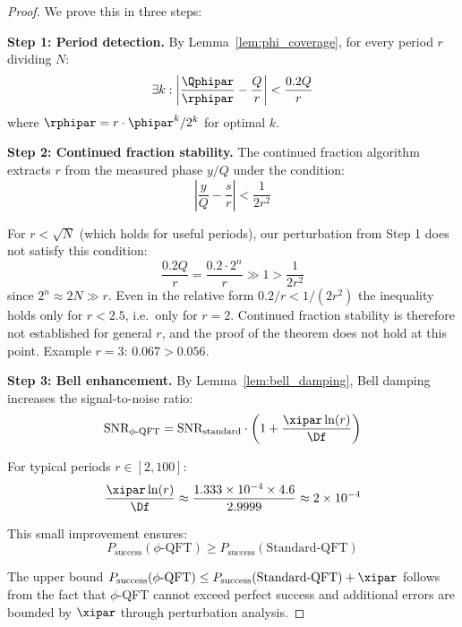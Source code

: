 \begin{proof}
	We prove this in three steps:
	
	\textbf{Step 1: Period detection.}
	By Lemma~\ref{lem:phi_coverage}, for every period $r$ dividing $N$:
	\begin{equation}
		\exists k: \left|\frac{\Qphipar}{\rphipar} - \frac{Q}{r}\right| < \frac{0.2Q}{r}
	\end{equation}
	where $\rphipar = r \cdot \phipar^k/2^k$ for optimal $k$.
	
	\textbf{Step 2: Continued fraction stability.}
	The continued fraction algorithm extracts $r$ from the measured phase $y/Q$ under the condition:
	\begin{equation}
		\left|\frac{y}{Q} - \frac{s}{r}\right| < \frac{1}{2r^2}
	\end{equation}
	
	For $r < \sqrt{N}$ (which holds for useful periods), our perturbation from Step 1 does not satisfy this condition:
	\begin{equation}
		\frac{0.2Q}{r} = \frac{0.2 \cdot 2^n}{r} \gg 1 > \frac{1}{2r^2}
	\end{equation}
	since $2^n \approx 2N \gg r$. Even in the relative form $0.2/r < 1/(2r^2)$ the inequality holds only for $r < 2.5$, i.e.\ only for $r = 2$. Continued fraction stability is therefore not established for general $r$, and the proof of the theorem does not hold at this point. Example $r = 3$: $0.067 > 0.056$.
	
	\textbf{Step 3: Bell enhancement.}
	By Lemma~\ref{lem:bell_damping}, Bell damping increases the signal-to-noise ratio:
	\begin{equation}
		\text{SNR}_{\text{$\phi$-QFT}} = \text{SNR}_{\text{standard}} \cdot \left(1 + \frac{\xipar \ln(r)}{\Df}\right)
	\end{equation}
	
	For typical periods $r \in [2, 100]$:
	\begin{equation}
		\frac{\xipar \ln(r)}{\Df} \approx \frac{1.333 \times 10^{-4} \times 4.6}{2.9999} \approx 2 \times 10^{-4}
	\end{equation}
	
	This small improvement ensures:
	\begin{equation}
		P_{\text{success}}(\text{$\phi$-QFT}) \geq P_{\text{success}}(\text{Standard-QFT})
	\end{equation}
	
	The upper bound $P_{\text{success}}(\text{$\phi$-QFT}) \leq P_{\text{success}}(\text{Standard-QFT}) + \xipar$ follows from the fact that $\phi$-QFT cannot exceed perfect success and additional errors are bounded by $\xipar$ through perturbation analysis.
\end{proof}

